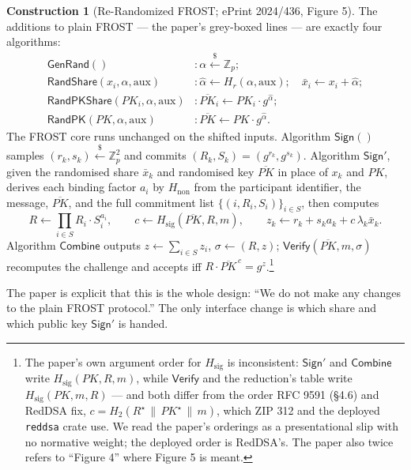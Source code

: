 \documentclass[11pt,a4paper]{article}
\theoremstyle{definition}
\newtheorem{construction}[theorem]{Construction}
\newcommand{\Z}{\mathbb{Z}}
\begin{document}
\begin{construction}[Re-Randomized FROST; ePrint 2024/436, Figure 5]
\label{def:fr-rerand-frost}
The additions to plain FROST --- the paper's grey-boxed lines --- are
exactly four algorithms:
\begin{align*}
\mathsf{GenRand}() &: \alpha \xleftarrow{\$} \Z_p; \\
\mathsf{RandShare}(x_i, \alpha, \mathrm{aux}) &:
  \hat{\alpha} \gets H_r(\alpha, \mathrm{aux}); \quad
  \bar{x}_i \gets x_i + \hat{\alpha}; \\
\mathsf{RandPKShare}(PK_i, \alpha, \mathrm{aux}) &:
  \overline{PK}_i \gets PK_i \cdot g^{\hat{\alpha}}; \\
\mathsf{RandPK}(PK, \alpha, \mathrm{aux}) &:
  \overline{PK} \gets PK \cdot g^{\hat{\alpha}}.
\end{align*}
The FROST core runs unchanged on the shifted inputs.
Algorithm $\mathsf{Sign}()$ samples $(r_k, s_k) \xleftarrow{\$} \Z_p^2$
and commits $(R_k, S_k) = (g^{r_k}, g^{s_k})$. Algorithm
$\mathsf{Sign}'$, given the
randomised share $\bar{x}_k$ and randomised key $\overline{PK}$ in place
of $x_k$ and $PK$, derives each binding factor $a_i$ by $H_{\mathrm{non}}$
from the participant identifier, the message, $\overline{PK}$, and the
full commitment list $\{(i, R_i, S_i)\}_{i \in S}$, then computes
\[
R \gets \prod_{i \in S} R_i \cdot S_i^{a_i}, \qquad
c \gets H_{\mathrm{sig}}(\overline{PK}, R, m), \qquad
z_k \gets r_k + s_k a_k + c\,\lambda_k \bar{x}_k .
\]
Algorithm $\mathsf{Combine}$ outputs $z \gets \sum_{i \in S} z_i$,
$\sigma \gets (R, z)$; $\mathsf{Verify}(\overline{PK}, m, \sigma)$
recomputes the challenge and accepts iff
$R \cdot \overline{PK}^{\,c} = g^z$.\footnote{The paper's own argument
order for $H_{\mathrm{sig}}$ is inconsistent: $\mathsf{Sign}'$ and
$\mathsf{Combine}$ write $H_{\mathrm{sig}}(PK, R, m)$, while
$\mathsf{Verify}$ and the reduction's table write
$H_{\mathrm{sig}}(PK, m, R)$ --- and both differ from the order RFC 9591
(\S4.6) and RedDSA fix,
$c = H_2(R^\star \,\|\, PK^\star \,\|\, m)$, which ZIP 312 and the
deployed \texttt{reddsa} crate use. We read the paper's orderings as a
presentational slip with no normative weight; the deployed order is
RedDSA's. The paper also twice refers to ``Figure 4'' where Figure 5 is
meant.}
\end{construction}

The paper is explicit that this is the whole design: ``We do not make any
changes to the plain FROST protocol.'' The only interface change is which
share and which public key $\mathsf{Sign}'$ is handed.
\end{document}
